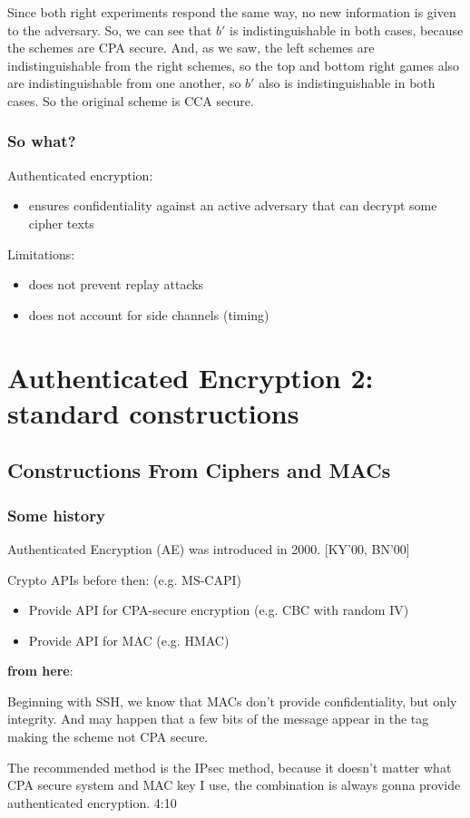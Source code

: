 \documentclass[12pt]{book}
\begin{document}
Since both right experiments respond the same way, no new information is given to the adversary. So, we can see that $b'$ is indistinguishable in both cases, because the schemes are CPA secure. And, as we saw, the left schemes are indistinguishable from the right schemes, so the top and bottom right games also are indistinguishable from one another, so $b'$ also is indistinguishable in both cases. So the original scheme is CCA secure.

\subsubsection{So what?}
Authenticated encryption:
\begin{itemize}
	\item ensures confidentiality against an active adversary that can decrypt some cipher texts
\end{itemize}

Limitations:
\begin{itemize}
	\item does not prevent replay attacks
	\item does not account for side channels (timing)
\end{itemize}

\newpage
\section{Authenticated Encryption 2: standard constructions}
\subsection{Constructions From Ciphers and MACs}
\subsubsection{Some history}
Authenticated Encryption (AE) was introduced in 2000. [KY'00, BN'00]

Crypto APIs before then: (e.g. MS-CAPI)
\begin{itemize}
	\item Provide API for CPA-secure encryption (e.g. CBC with random IV)
	\item Provide API for MAC (e.g. HMAC)
\end{itemize}

\textbf{from here}:

Beginning with SSH, we know that MACs don't provide confidentiality, but only integrity. And may happen that a few bits of the message appear in the tag making the scheme not CPA secure.

The recommended method is the IPsec method, because it doesn't matter what CPA secure system and MAC key I use, the combination is always gonna provide authenticated encryption.
4:10
\end{document}
